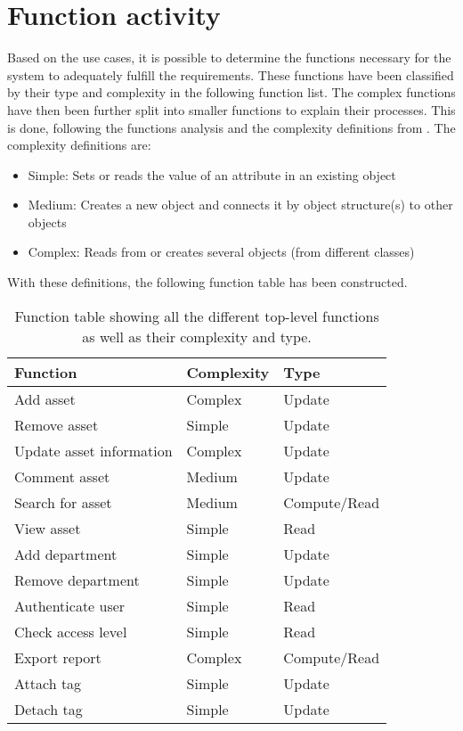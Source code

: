 \section{Function activity}\label{sc:function}
Based on the use cases, it is possible to determine the functions necessary for the system to adequately fulfill the requirements. These functions have been classified by their type and complexity in the following function list. The complex functions have then been further split into smaller functions to explain their processes. This is done, following the functions analysis and the complexity definitions from \cite[chap 7]{OOAD}. The complexity definitions are:
\begin{itemize}
    \item Simple: Sets or reads the value of an attribute in an existing object
    \item Medium: Creates a new object and connects it by object structure(s) to other objects
    \item Complex: Reads from or creates several objects (from different classes)
\end{itemize}
With these definitions, the following function table has been constructed.

\begin{table}[H]
\centering
    \begin{tabular}{|l|l|l|}
        \hline
        \textbf{Function} & \textbf{Complexity} & \textbf{Type} \\
        \hline
        \hline
        Add asset & Complex & Update\\
        \hline
        Remove asset & Simple & Update\\
        \hline
        Update asset information & Complex & Update\\
        \hline
        Comment asset & Medium & Update\\
        \hline
        Search for asset & Medium & Compute/Read\\
        \hline
        View asset & Simple & Read\\
        \hline
        Add department & Simple & Update\\
        \hline
        Remove department & Simple & Update\\
        \hline
        Authenticate user & Simple & Read\\
        \hline
        Check access level & Simple & Read\\
        \hline
        Export report & Complex & Compute/Read\\
        \hline
        Attach tag & Simple & Update\\
        \hline
        Detach tag & Simple & Update\\
        \hline
    \end{tabular}
\caption{Function table showing all the different top-level functions as well as their complexity and type.}\label{tab:functions}
\end{table}

